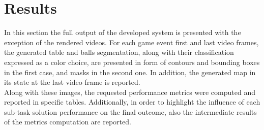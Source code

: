\section{Results}
In this section the full output of the developed system is presented with the exception of the rendered videos.
For each game event first and last video frames, the generated table and balls segmentation, along with their classification expressed as a color choice,
are presented in form of contours and bounding boxes in the first case, and masks in the second one.
In addition, the generated map in its state at the last video frame is reported.
\\
Along with these images, the requested performance metrics were computed and reported in specific tables.
Additionally, in order to highlight the influence of each sub-task solution performance on the final outcome,
also the intermediate results of the metrics computation are reported.


